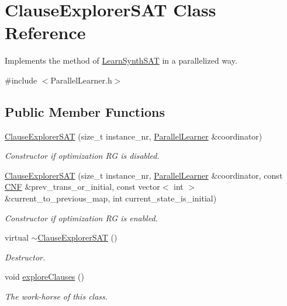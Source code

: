 \hypertarget{classClauseExplorerSAT}{\section{Clause\-Explorer\-S\-A\-T Class Reference}
\label{classClauseExplorerSAT}
}


Implements the method of \hyperlink{classLearnSynthSAT}{Learn\-Synth\-S\-A\-T} in a parallelized way.  




{\ttfamily \#include $<$Parallel\-Learner.\-h$>$}

\subsection*{Public Member Functions}
\begin{DoxyCompactItemize}
\item 
\hyperlink{classClauseExplorerSAT_afef2a28a6052b9d42de7d33736d53439}{Clause\-Explorer\-S\-A\-T} (size\-\_\-t instance\-\_\-nr, \hyperlink{classParallelLearner}{Parallel\-Learner} \&coordinator)
\begin{DoxyCompactList}\small\item\em Constructor if optimization R\-G is disabled. \end{DoxyCompactList}\item 
\hyperlink{classClauseExplorerSAT_aeb039a6f4bcccd7a899c22afbd2fd821}{Clause\-Explorer\-S\-A\-T} (size\-\_\-t instance\-\_\-nr, \hyperlink{classParallelLearner}{Parallel\-Learner} \&coordinator, const \hyperlink{classCNF}{C\-N\-F} \&prev\-\_\-trans\-\_\-or\-\_\-initial, const vector$<$ int $>$ \&current\-\_\-to\-\_\-previous\-\_\-map, int current\-\_\-state\-\_\-is\-\_\-initial)
\begin{DoxyCompactList}\small\item\em Constructor if optimization R\-G is enabled. \end{DoxyCompactList}\item 
virtual \hyperlink{classClauseExplorerSAT_aa5e321a156ef7fa6e21946594e500668}{$\sim$\-Clause\-Explorer\-S\-A\-T} ()
\begin{DoxyCompactList}\small\item\em Destructor. \end{DoxyCompactList}\item 
void \hyperlink{classClauseExplorerSAT_aae50270504a523ae79458c7eb1f2e9d1}{explore\-Clauses} ()
\begin{DoxyCompactList}\small\item\em The work-\/horse of this class. \end{DoxyCompactList}\item 

\end{DoxyCompactItemize}
